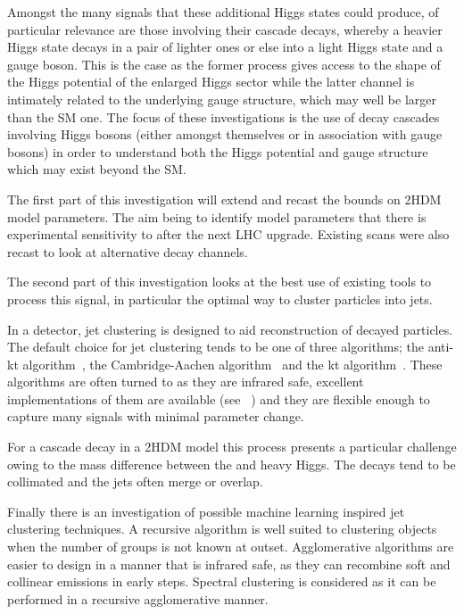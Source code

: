 Amongst the many signals that these additional Higgs states could produce,
of particular relevance are those involving their cascade decays,
whereby a heavier Higgs state decays in a pair of lighter ones or else into a light Higgs state and a gauge boson.
This is the case as the former process gives access to the shape of the Higgs potential of the enlarged Higgs sector
while the latter channel is intimately related to the underlying gauge structure, which may well be larger than the SM one. 
The focus of these investigations is the use of decay cascades involving Higgs bosons (either amongst themselves or in association with gauge bosons) in order to understand both the Higgs potential and gauge structure which may exist beyond the SM.

The first part of this investigation will extend and recast the bounds on
2HDM model parameters.
The aim being to identify model parameters that there is experimental sensitivity to after the next LHC upgrade.
Existing scans were also recast to look at alternative decay channels.

The second part of this investigation looks at the best use of existing tools
to process this signal,
in particular the optimal way to cluster particles into jets.

In a detector, jet clustering is designed to aid reconstruction of decayed particles.
The default choice for jet clustering tends to be one of three algorithms;
the anti-kt algorithm~\cite{Cacciari2008akt}, the Cambridge-Aachen algorithm~\cite{Wobisch1998caJet} and the kt algorithm~\cite{Ellis1993ktJet}.
These algorithms are often turned to as they are infrared safe, excellent implementations of them are available (see \fastjet{}~\cite{Cacciari2011FastJet})
and they are flexible enough to capture many signals with minimal parameter change.

For a cascade decay in a 2HDM model this process presents a particular challenge owing to the
mass difference between the  and heavy Higgs.
The decays tend to be collimated and the jets often merge or overlap.

Finally there is an investigation of possible machine learning inspired jet clustering techniques.
A recursive algorithm is well suited to clustering objects when the number of groups is not known at outset.
Agglomerative algorithms are easier to design in a manner that is infrared safe,
as they can recombine soft and collinear emissions in early steps.
Spectral clustering is considered as it can be performed in a recursive agglomerative manner.


